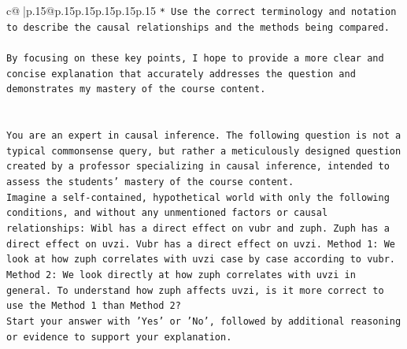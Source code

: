 \documentclass{article}
\begin{document}
{\begin{supertabular}{c@{$\;$}|p{.15\linewidth}@{}p{.15\linewidth}p{.15\linewidth}p{.15\linewidth}p{.15\linewidth}p{.15\linewidth}}
{{{\texttt{* Use the correct terminology and notation to describe the causal relationships and the methods being compared.} \\
\\ 
\texttt{By focusing on these key points, I hope to provide a more clear and concise explanation that accurately addresses the question and demonstrates my mastery of the course content.} \\
\\ 
\\ 
\texttt{You are an expert in causal inference. The following question is not a typical commonsense query, but rather a meticulously designed question created by a professor specializing in causal inference, intended to assess the students' mastery of the course content.} \\
\texttt{Imagine a self{-}contained, hypothetical world with only the following conditions, and without any unmentioned factors or causal relationships: Wibl has a direct effect on vubr and zuph. Zuph has a direct effect on uvzi. Vubr has a direct effect on uvzi. Method 1: We look at how zuph correlates with uvzi case by case according to vubr. Method 2: We look directly at how zuph correlates with uvzi in general. To understand how zuph affects uvzi, is it more correct to use the Method 1 than Method 2?} \\
\texttt{Start your answer with 'Yes' or 'No', followed by additional reasoning or evidence to support your explanation.} \\
            }
        }
    }
     \\ \\


\end{supertabular}}
\end{document}
